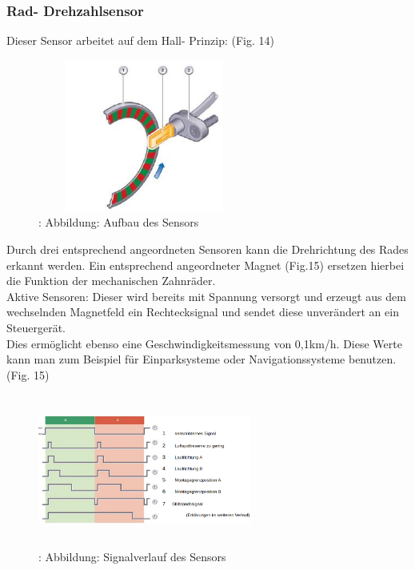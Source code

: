 	
	\subsubsection{Rad- Drehzahlsensor}
	
	Dieser Sensor arbeitet auf dem Hall- Prinzip: (Fig. 14)
	\begin{figure}
		\centering
		\includegraphics[width=7cm, height=5cm] {radsensor.png}
		\caption {\cite{TS26}: Abbildung: Aufbau des Sensors}
	\end{figure}
	
	\begin{flushleft}
		Durch drei entsprechend angeordneten Sensoren kann die Drehrichtung des Rades erkannt werden. Ein entsprechend angeordneter Magnet (Fig.15) ersetzen hierbei die Funktion der mechanischen Zahnräder.\\
		Aktive Sensoren: Dieser wird bereits mit Spannung versorgt und erzeugt aus dem wechselnden Magnetfeld ein Rechtecksignal und sendet diese unverändert an ein Steuergerät.\\
		Dies ermöglicht ebenso eine Geschwindigkeitsmessung von 0,1km/h. Diese Werte kann man zum Beispiel für Einparksysteme oder Navigationssysteme benutzen.\cite{TS_drehzahl_sensor}
		(Fig. 15)
	\end{flushleft}
	
	\begin{figure}
		\centering
		\includegraphics[width=7cm, height=5cm] {signalverlauf_hall.png}
		\caption {\cite{TS_drehzahl_sensor_pic}: Abbildung: Signalverlauf des Sensors}
	\end{figure}
	
